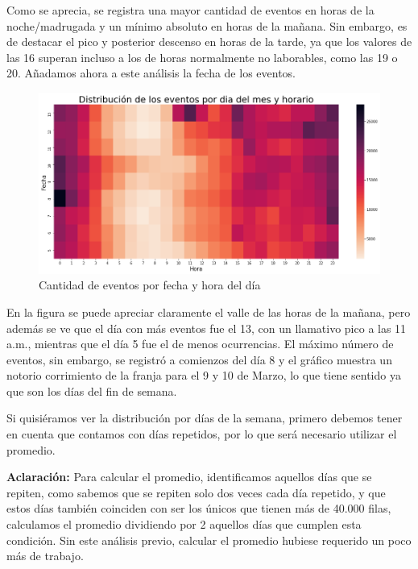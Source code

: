 \documentclass[a4paper, 12pt]{article}
\begin{document}
		Como se aprecia, se registra una mayor cantidad de eventos en horas de la noche/madrugada y un mínimo absoluto en horas de la mañana. Sin embargo, es de destacar el pico y posterior descenso en horas de la tarde, ya que los valores de las 16 superan incluso a los de horas normalmente no laborables, como las 19 o 20.
		Añadamos ahora a este análisis la fecha de los eventos.
		
		\FloatBarrier
		\begin{figure}[h]
			\centering
			\includegraphics[width=\textwidth]{images/events/eventsxdiayhora.png}
			\caption{Cantidad de eventos por fecha y hora del día}
		\end{figure}
		\FloatBarrier
		
		En la figura se puede apreciar claramente el valle de las horas de la mañana, pero además se ve que el día con más eventos fue el 13, con un llamativo pico a las 11 a.m., mientras que el día 5 fue el de menos ocurrencias. El máximo número de eventos, sin embargo, se registró a comienzos del día 8 y el gráfico muestra un notorio corrimiento de la franja para el 9 y 10 de Marzo, lo que tiene sentido ya que son los días del fin de semana.
		
		Si quisiéramos ver la distribución por días de la semana, primero debemos tener en cuenta que contamos con días repetidos, por lo que será necesario utilizar el promedio.

		\textbf{Aclaración:} Para calcular el promedio, identificamos aquellos días que se repiten, como sabemos que se repiten solo dos veces cada día repetido,
		y que estos días también coinciden con ser los únicos que tienen más de 40.000 filas, calculamos el promedio dividiendo
		por 2 aquellos días que cumplen esta condición. Sin este análisis previo, calcular el promedio hubiese requerido un poco
		 más de trabajo.
\end{document}
